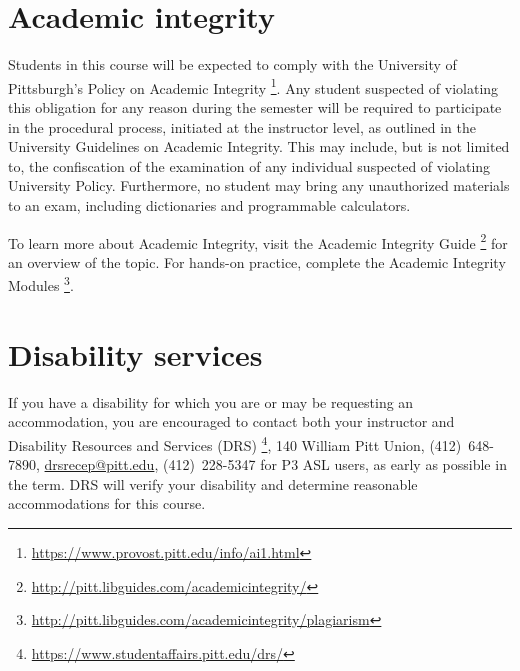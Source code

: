 \documentclass[12pt]{article}
\begin{document}
\section{Academic integrity}

Students in this course %
will be expected to comply with %
the University of Pittsburgh's %
Policy on Academic Integrity%
\footnote{\url{https://www.provost.pitt.edu/info/ai1.html}}.
%
Any student suspected of violating this obligation %
for any reason during the semester %
will be required to participate in the procedural process, %
initiated at the instructor level, %
as outlined in the University Guidelines on Academic Integrity.
%
This may include, %
but is not limited to, %
the confiscation of the examination %
of any individual suspected of violating University Policy.
%
Furthermore, %
no student may bring any unauthorized materials to an exam, %
including dictionaries and programmable calculators.

To learn more about Academic Integrity, %
visit the Academic Integrity Guide%
\footnote{\url{http://pitt.libguides.com/academicintegrity/}} %
for an overview of the topic.
%
For hands-on practice, %
complete the Academic Integrity Modules%
\footnote{\url{http://pitt.libguides.com/academicintegrity/plagiarism}}.

\section{Disability services}

If you have a disability %
for which you are or may be requesting an accommodation, %
you are encouraged to contact %
both your instructor and Disability Resources and Services (DRS)%
\footnote{\url{https://www.studentaffairs.pitt.edu/drs/}}, %
140 William Pitt Union, %
(412)~648-7890, %
\href{mailto:drsrecep@pitt.edu}{drsrecep@pitt.edu}, %
(412)~228-5347 for P3 ASL users, %
as early as possible in the term.
%
DRS will verify your disability %
and determine reasonable accommodations for this course.

\label{mylastpage}              %
\newpage
\appendix
\setcounter{page}{1}
\renewcommand{\thepage}{\arabic{page}}
\fancyhead[r]{Appendix Page \thepage{} of~\pageref*{mylastappendixpage}}
\printbibliography[heading=none]{}%
\label{mylastappendixpage}
\end{document}
